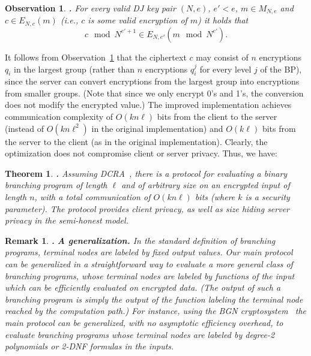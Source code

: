 \documentclass[11pt]{article}
\newtheorem{THEOREM}{Theorem}[section]
\newenvironment{theorem}{\begin{THEOREM} \hspace{-.85em} {\bf .} \rm}%
	{\end{THEOREM}}
\newtheorem{REMARK}{Remark}[section]
\newenvironment{remark}{\begin{REMARK} \hspace{-.85em} {\bf .} \rm}%
	{\end{REMARK}}
\newtheorem{OBSERVATION}{Observation}[section]
\newenvironment{observation}{\begin{OBSERVATION} \hspace{-.85em} {\bf .} \rm}%
	{\end{OBSERVATION}}
\begin{document}
\begin{observation}
\label{obs-short} For every valid DJ key pair $(N,e)$, $e'<e$,
$m\in M_{N,e}$ and $c\in{E_{N,e}(m)}$ (i.e., $c$ is some valid
encryption of $m$) it holds that \[ c\mod N^{e'+1} \in
E_{N,e'}(m\mod N^{e'}).\]
\end{observation}
It follows from Observation~\ref{obs-short} that the ciphertext $c$
may consist of $n$ encryptions $q_i$ in the largest group (rather
than $n$ encryptions $q_i^j$ for every level $j$ of the BP), since
the server can convert encryptions from the largest group into
encryptions from smaller groups. (Note that since we only encrypt
0's and 1's, the conversion does not modify the encrypted value.)
The improved implementation achieves communication complexity of
$O(kn\ell)$ bits from the client to the server (instead of
$O(kn\ell^2)$ in the original implementation) and $O(k\ell)$ bits
from the server to the client (as in the original implementation).
Clearly, the optimization does not compromise client or server
privacy. Thus, we have:

\begin{theorem}
Assuming DCRA~\cite{DJ01}, there is a protocol for evaluating a
binary branching program of length $\ell$ and of arbitrary size on
an encrypted input of length $n$, with a total communication of
$O(kn\ell)$ bits (where $k$ is a security parameter). The protocol
provides client privacy, as well as size hiding server privacy in
the semi-honest model.
\end{theorem}


\begin{remark}{\bf A generalization.}
In the standard definition of branching programs, terminal nodes
are labeled by fixed output values. Our main protocol can be
generalized in a straightforward way to evaluate a more general
class of branching programs, whose terminal nodes are labeled by
functions of the input which can be efficiently evaluated on
encrypted data. (The output of such a branching program is simply
the output of the function labeling the terminal node reached by
the computation path.) For instance, using the BGN
cryptosystem~\cite{BGN} the main protocol can be generalized, with
no asymptotic efficiency overhead, to evaluate branching programs
whose terminal nodes are labeled by degree-2 polynomials or 2-DNF
formulas in the inputs.
\end{remark}
\end{document}
